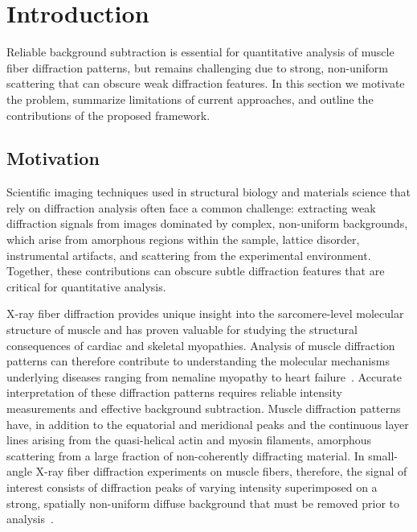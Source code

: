 \documentclass[iucr]{iucrjournals}
\begin{document}




\section{Introduction}

Reliable background subtraction is essential for quantitative analysis of muscle fiber diffraction patterns, but remains challenging due to strong, non-uniform scattering that can obscure weak diffraction features. In this section we motivate the problem, summarize limitations of current approaches, and outline the contributions of the proposed framework.

\subsection{Motivation}

Scientific imaging techniques used in structural biology and materials science that rely on diffraction analysis often face a common challenge: extracting weak diffraction signals from images dominated by complex, non-uniform backgrounds, which arise from amorphous regions within the sample, lattice disorder, instrumental artifacts, and scattering from the experimental environment. Together, these contributions can obscure subtle diffraction features that are critical for quantitative analysis.

X-ray fiber diffraction provides unique insight into the sarcomere-level molecular structure of muscle and has proven valuable for studying the structural consequences of cardiac and skeletal myopathies. Analysis of muscle diffraction patterns can therefore contribute to understanding the molecular mechanisms underlying diseases ranging from nemaline myopathy to heart failure~\cite{MaIrving2022}. Accurate interpretation of these diffraction patterns requires reliable intensity measurements and effective background subtraction. Muscle diffraction patterns have, in addition to the equatorial and meridional peaks and the continuous layer lines arising from the quasi-helical actin and myosin filaments, amorphous scattering from a large fraction of non-coherently diffracting material. In small-angle X-ray fiber diffraction experiments on muscle fibers, therefore, the signal of interest consists of diffraction peaks of varying intensity superimposed on a strong, spatially non-uniform diffuse background that must be removed prior to analysis~\cite{squire2003ccp13_software}.
\end{document}
